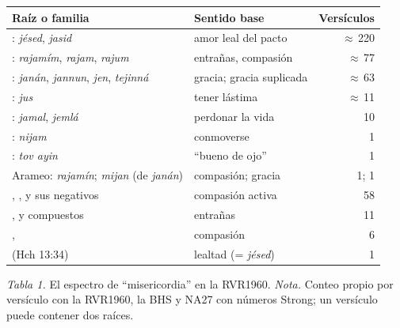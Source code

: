 \begin{center}\small\renewcommand{\arraystretch}{1.18}
\begin{tabular}{@{}L{5.2cm}L{4.4cm}r@{}}
\toprule
\textbf{Raíz o familia} & \textbf{Sentido base} & \textbf{Versículos} \\ \midrule
{}: \emph{jésed}, \emph{jasid} & amor leal del pacto & $\approx$\,220 \\
: \emph{rajamím}, \emph{rajam}, \emph{rajum} & entrañas, compasión & $\approx$\,77 \\
: \emph{janán}, \emph{jannun}, \emph{jen}, \emph{tejinná} & gracia; gracia suplicada & $\approx$\,63 \\
: \emph{jus} & tener lástima & $\approx$\,11 \\
: \emph{jamal}, \emph{jemlá} & perdonar la vida & 10 \\
: \emph{nijam} & conmoverse & 1 \\
: \emph{tov ayin} & ``bueno de ojo'' & 1 \\
Arameo: \emph{rajamín}; \emph{mijan} (de \emph{janán}) & compasión; gracia & 1; 1 \\
, ,  y sus negativos & compasión activa & 58 \\
,  y compuestos & entrañas & 11 \\
,  & compasión & 6 \\
 (Hch 13:34) & lealtad (= \emph{jésed}) & 1 \\
\bottomrule
\end{tabular}\par
{\footnotesize\color{gris}\textit{Tabla 1.} El espectro de ``misericordia'' en la RVR1960. \textit{Nota.} Conteo propio por versículo con la RVR1960, la BHS y NA27 con números Strong; un versículo puede contener dos raíces.}
\end{center}



